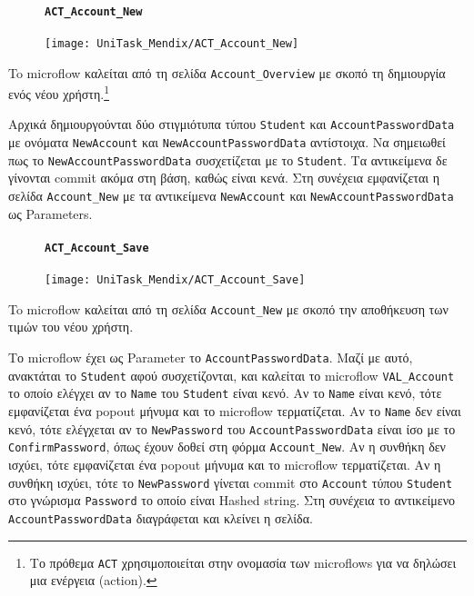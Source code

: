                 \begin{figure}[H] \noindent
                    \paragraph{\texttt{ACT\_Account\_New}}
                    \begin{center}
                        \texttt{[image: UniTask\_Mendix/ACT\_Account\_New]}
                    \end{center}
                \end{figure}

                    To microflow καλείται από τη σελίδα \texttt{Account\_Overview} με σκοπό τη δημιουργία ενός νέου χρήστη.\footnote{Το πρόθεμα \texttt{ACT} χρησιμοποιείται στην ονομασία των microflows για να δηλώσει μια ενέργεια (action).}

                    Αρχικά δημιουργούνται δύο στιγμιότυπα τύπου \texttt{Student} και \texttt{AccountPasswordData} με ονόματα \texttt{NewAccount} και \texttt{NewAccountPasswordData} αντίστοιχα. Να σημειωθεί πως το \texttt{NewAccountPasswordData} συσχετίζεται με το \texttt{Student}. Τα αντικείμενα δε γίνονται commit ακόμα στη βάση, καθώς είναι κενά. Στη συνέχεια εμφανίζεται η σελίδα \texttt{Account\_New} με τα αντικείμενα \texttt{NewAccount} και \texttt{NewAccountPasswordData} ως Parameters.

                \begin{figure}[H] \noindent
                    \paragraph{\texttt{ACT\_Account\_Save}}
                    \begin{center}
                        \texttt{[image: UniTask\_Mendix/ACT\_Account\_Save]}
                    \end{center}
                \end{figure}

                    To microflow καλείται από τη σελίδα \texttt{Account\_New} με σκοπό την αποθήκευση των τιμών του νέου χρήστη.

                    Το microflow έχει ως Parameter το \texttt{AccountPasswordData}. Μαζί με αυτό, ανακτάται το \texttt{Student} αφού συσχετίζονται, και καλείται το microflow \texttt{VAL\_Account} το οποίο ελέγχει αν το \texttt{Name} του \texttt{Student} είναι κενό. Αν το \texttt{Name} είναι κενό, τότε εμφανίζεται ένα popout μήνυμα και το microflow τερματίζεται. Αν το \texttt{Name} δεν είναι κενό, τότε ελέγχεται αν το \texttt{NewPassword} του \texttt{AccountPasswordData} είναι ίσο με το \texttt{ConfirmPassword}, όπως έχουν δοθεί στη φόρμα \texttt{Account\_New}. Αν η συνθήκη δεν ισχύει, τότε εμφανίζεται ένα popout μήνυμα και το microflow τερματίζεται. Αν η συνθήκη ισχύει, τότε το \texttt{NewPassword} γίνεται commit στο \texttt{Account} τύπου \texttt{Student} στο γνώρισμα \texttt{Password} το οποίο είναι Hashed string. Στη συνέχεια το αντικείμενο \texttt{AccountPasswordData} διαγράφεται και κλείνει η σελίδα.

